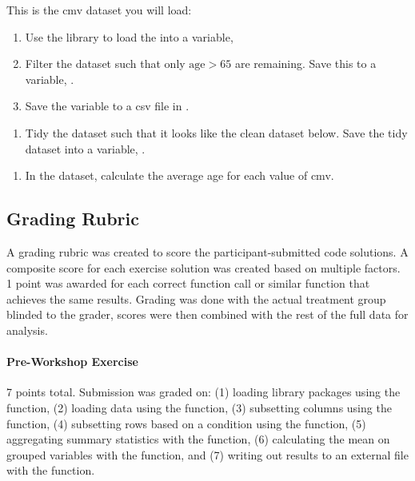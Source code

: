 \documentclass[040-assessment.tex]{subfiles}
\begin{document}
    \begin{displayquote}

        This is the cmv dataset you will load:

        \begin{enumerate}
            \item Use the  library to load the  into a variable, 
            \item Filter the  dataset such that only $\text{age} > 65$ are remaining.
                  Save this to a variable, .
            \item Save the  variable to a csv file in .
        \end{enumerate}

        \begin{enumerate}
            \item Tidy the  dataset such that it looks like the clean dataset below.
                  Save the tidy dataset into a variable, .
        \end{enumerate}

        \begin{enumerate}
            \item In the  dataset, calculate the average age for each value of cmv.
        \end{enumerate}

    \end{displayquote}

\subsection{Grading Rubric}

    A grading rubric was created to score the participant-submitted code solutions.
    A composite score for each exercise solution was created based on multiple factors.
    1 point was awarded for each correct function call or similar function that achieves the same results.
    Grading was done with the actual treatment group blinded to the grader,
    scores were then combined with the rest of the full data for analysis.

    \paragraph{Pre-Workshop Exercise}

        7 points total.
        Submission was graded on:
        (1) loading library packages using the  function,
        (2) loading data using the  function,
        (3) subsetting columns using the  function,
        (4) subsetting rows based on a condition using the  function,
        (5) aggregating summary statistics with the  function,
        (6) calculating the mean on grouped variables with the  function, and
        (7) writing out results to an external file with the  function.
\end{document}
